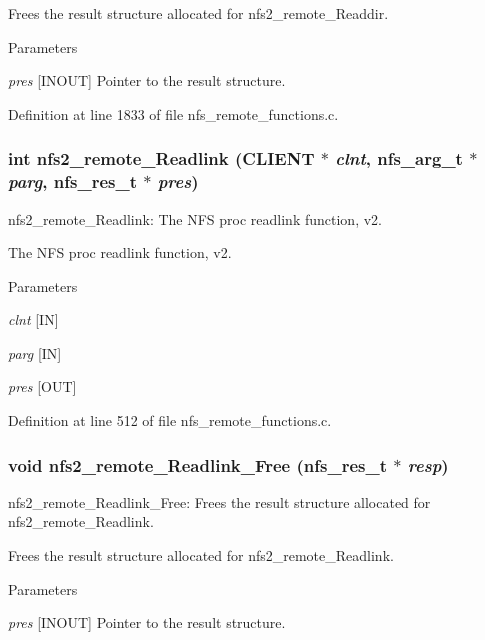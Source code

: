 Frees the result structure allocated for nfs2\_\-remote\_\-Readdir.


\begin{DoxyParams}{Parameters}
\item[{\em pres}][INOUT] Pointer to the result structure. \end{DoxyParams}


Definition at line 1833 of file nfs\_\-remote\_\-functions.c.
\subsubsection[{nfs2\_\-remote\_\-Readlink}]{\setlength{\rightskip}{0pt plus 5cm}int nfs2\_\-remote\_\-Readlink (CLIENT $\ast$ {\em clnt}, \/  nfs\_\-arg\_\-t $\ast$ {\em parg}, \/  nfs\_\-res\_\-t $\ast$ {\em pres})}\label{group__NFSprocs_ga952a91aff786a5ceb1565469ca8fbc05}
nfs2\_\-remote\_\-Readlink: The NFS proc readlink function, v2.

The NFS proc readlink function, v2.


\begin{DoxyParams}{Parameters}
\item[{\em clnt}][IN] \item[{\em parg}][IN] \item[{\em pres}][OUT] \end{DoxyParams}


Definition at line 512 of file nfs\_\-remote\_\-functions.c.
\subsubsection[{nfs2\_\-remote\_\-Readlink\_\-Free}]{\setlength{\rightskip}{0pt plus 5cm}void nfs2\_\-remote\_\-Readlink\_\-Free (nfs\_\-res\_\-t $\ast$ {\em resp})}\label{group__NFSprocs_gad49a28a741852134cf6219851176e40c}
nfs2\_\-remote\_\-Readlink\_\-Free: Frees the result structure allocated for nfs2\_\-remote\_\-Readlink.

Frees the result structure allocated for nfs2\_\-remote\_\-Readlink.


\begin{DoxyParams}{Parameters}
\item[{\em pres}][INOUT] Pointer to the result structure. \end{DoxyParams}


